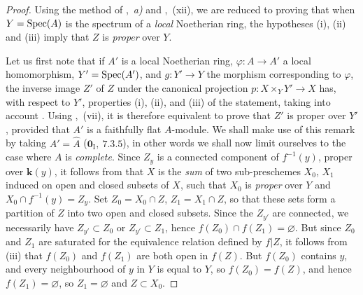 \begin{proof}
Using the method of ,~\emph{a)} and ,~(xii), we are reduced to proving that when $Y=\operatorname{Spec}(A)$ is the spectrum of a \emph{local} Noetherian ring, the hypotheses (i), (ii) and (iii) imply that $Z$ is \emph{proper} over $Y$.

Let us first note that if $A'$ is a local Noetherian ring, $\varphi:A\to A'$ a local homomorphism, $Y'=\operatorname{Spec}(A')$, and $g:Y'\to Y$ the morphism corresponding to $\varphi$, the inverse image $Z'$ of $Z$ under the canonical projection $p:X\times_Y Y'\to X$ has, with respect to $Y'$, properties (i), (ii), and (iii) of the statement, taking into account . Using ,~(vii), it is therefore equivalent to prove that $Z'$ is proper over $Y'$, provided that $A'$ is a faithfully flat $A$-module.
We shall make use of this remark by taking $A'=\hat{A}$ ($\mathbf{0}_{\mathrm{I}},~7.3.5$), in other words we shall now limit ourselves to the case where $A$ is \emph{complete}.
Since $Z_y$ is a connected component of $f^{-1}(y)$, proper over $\boldsymbol{k}(y)$, it follows from  that $X$ is the \emph{sum} of two sub-preschemes $X_0$, $X_1$ induced on open and closed subsets of $X$, such that $X_0$ is \emph{proper} over $Y$ and $X_0\cap f^{-1}(y)=Z_y$.
Set $Z_0=X_0\cap Z$, $Z_1=X_1\cap Z$, so that these sets form a partition of $Z$ into two open and closed subsets.
Since the $Z_{y'}$ are connected, we necessarily have $Z_{y'}\subset Z_0$ or $Z_{y'}\subset Z_1$, hence $f(Z_0)\cap f(Z_1)=\varnothing$.
But since $Z_0$ and $Z_1$ are saturated for the equivalence relation defined by $f|Z$, it follows from (iii) that $f(Z_0)$ and $f(Z_1)$ are both open in $f(Z)$.
But $f(Z_0)$ contains $y$, and every neighbourhood of $y$ in $Y$ is equal to $Y$, so $f(Z_0)=f(Z)$, and hence $f(Z_1)=\varnothing$, so $Z_1=\varnothing$ and $Z\subset X_0$.


\end{proof}
